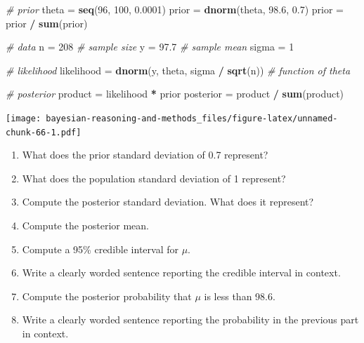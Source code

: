 \documentclass[
]{book}
\newenvironment{Shaded}{\begin{snugshade}}{\end{snugshade}}
\newcommand{\CommentTok}[1]{\textcolor[rgb]{0.56,0.35,0.01}{\textit{#1}}}
\newcommand{\DecValTok}[1]{\textcolor[rgb]{0.00,0.00,0.81}{#1}}
\newcommand{\FloatTok}[1]{\textcolor[rgb]{0.00,0.00,0.81}{#1}}
\newcommand{\KeywordTok}[1]{\textcolor[rgb]{0.13,0.29,0.53}{\textbf{#1}}}
\newcommand{\NormalTok}[1]{#1}
\newcommand{\OperatorTok}[1]{\textcolor[rgb]{0.81,0.36,0.00}{\textbf{#1}}}
\newcommand{\StringTok}[1]{\textcolor[rgb]{0.31,0.60,0.02}{#1}}
\providecommand{\tightlist}{%
  \setlength{\itemsep}{0pt}\setlength{\parskip}{0pt}}
\theoremstyle{definition}
\theoremstyle{definition}
\theoremstyle{definition}
\theoremstyle{remark}
\begin{document}
\begin{Shaded}
\begin{Highlighting}[]
\CommentTok{\# prior}
\NormalTok{theta =}\StringTok{ }\KeywordTok{seq}\NormalTok{(}\DecValTok{96}\NormalTok{, }\DecValTok{100}\NormalTok{, }\FloatTok{0.0001}\NormalTok{)}
\NormalTok{prior =}\StringTok{ }\KeywordTok{dnorm}\NormalTok{(theta, }\FloatTok{98.6}\NormalTok{, }\FloatTok{0.7}\NormalTok{)}
\NormalTok{prior =}\StringTok{ }\NormalTok{prior }\OperatorTok{/}\StringTok{ }\KeywordTok{sum}\NormalTok{(prior)}

\CommentTok{\# data}
\NormalTok{n =}\StringTok{ }\DecValTok{208} \CommentTok{\# sample size}
\NormalTok{y =}\StringTok{ }\FloatTok{97.7} \CommentTok{\# sample mean}
\NormalTok{sigma =}\StringTok{ }\DecValTok{1}

\CommentTok{\# likelihood}
\NormalTok{likelihood =}\StringTok{ }\KeywordTok{dnorm}\NormalTok{(y, theta, sigma }\OperatorTok{/}\StringTok{ }\KeywordTok{sqrt}\NormalTok{(n)) }\CommentTok{\# function of theta}

\CommentTok{\# posterior}
\NormalTok{product =}\StringTok{ }\NormalTok{likelihood }\OperatorTok{*}\StringTok{ }\NormalTok{prior}
\NormalTok{posterior =}\StringTok{ }\NormalTok{product }\OperatorTok{/}\StringTok{ }\KeywordTok{sum}\NormalTok{(product)}
\end{Highlighting}
\end{Shaded}

\texttt{[image: bayesian-reasoning-and-methods\_files/figure-latex/unnamed-chunk-66-1.pdf]}

\begin{enumerate}
\def\labelenumi{\arabic{enumi}.}
\tightlist
\item
  What does the prior standard deviation of 0.7 represent?
\item
  What does the population standard deviation of 1 represent?
\item
  Compute the posterior standard deviation. What does it represent?
\item
  Compute the posterior mean.
\item
  Compute a 95\% credible interval for \(\mu\).
\item
  Write a clearly worded sentence reporting the credible interval in context.
\item
  Compute the posterior probability that \(\mu\) is less than 98.6.
\item
  Write a clearly worded sentence reporting the probability in the previous part in context.
\end{enumerate}
\end{document}
